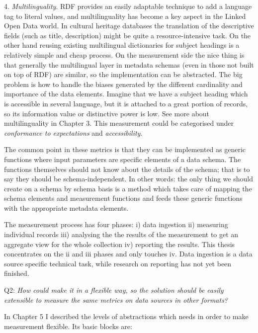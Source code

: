 4. \emph{Multilinguality}. RDF provides an easily adaptable technique to add a language tag to literal values, and multilinguality has become a key aspect in the Linked Open Data world. In cultural heritage databases the translation of the descriptive fields (such as title, description) might be quite a resource-intensive task. On the other hand reusing existing multilingual dictionaries for subject headings is a relatively simple and cheap process. On the measurement side the nice thing is that generally the multilingual layer in metadata schemas (even in those not built on top of RDF) are similar, so the implementation can be abstracted. The big problem is how to handle the biases generated by the different cardinality and importance of the data elements. Imagine that we have a subject heading which is accessible in several language, but it is attached to a great portion of records, so its information value or distinctive power is low. See more about multilinguality in Chapter 3. This measurement could be categorised under \emph{conformance to expectations} and \emph{accessibility}.

The common point in these metrics is that they can be implemented as generic functions where input parameters are specific elements of a data schema. The functions themselves should not know about the details of the schema; that is to say they should be schema-independent. In other words: the only thing we should create on a schema by schema basis is a method which takes care of mapping the schema elements and measurement functions and feeds these generic functions with the appropriate metadata elements.

The measurement process has four phases: i) data ingestion ii) measuring individual records iii) analysing the the results of the measurement to get an aggregate view for the whole collection iv) reporting the results. This thesis concentrates on the ii and iii phases and only touches iv. Data ingestion is a data source specific technical task, while research on reporting has not yet been finished.

Q2: \emph{How could make it in a flexible way, so the solution should be easily extensible to measure the same metrics on data sources in other formats?}

In Chapter 5 I described the levels of abstractions which needs in order to make measurement flexible. Its basic blocks are:

